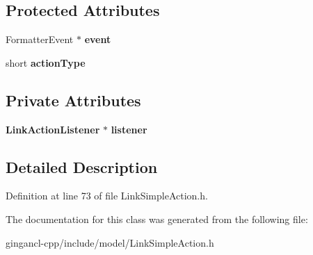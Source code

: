 \subsection*{Protected Attributes}
\begin{CompactItemize}
\item 
FormatterEvent $\ast$ {\bf event}\label{classbr_1_1pucrio_1_1telemidia_1_1ginga_1_1ncl_1_1model_1_1link_1_1LinkSimpleAction_c0141f472cfbecf4656651e1588d1b02}

\item 
short {\bf actionType}\label{classbr_1_1pucrio_1_1telemidia_1_1ginga_1_1ncl_1_1model_1_1link_1_1LinkSimpleAction_00c66fcc76fe2bd2f66116c70e00f49b}

\end{CompactItemize}
\subsection*{Private Attributes}
\begin{CompactItemize}
\item 
{\bf LinkActionListener} $\ast$ {\bf listener}\label{classbr_1_1pucrio_1_1telemidia_1_1ginga_1_1ncl_1_1model_1_1link_1_1LinkSimpleAction_ee7d07ff8ec738e488e44c2e6b392a02}

\end{CompactItemize}


\subsection{Detailed Description}




Definition at line 73 of file LinkSimpleAction.h.

The documentation for this class was generated from the following file:\begin{CompactItemize}
\item 
gingancl-cpp/include/model/LinkSimpleAction.h\end{CompactItemize}
